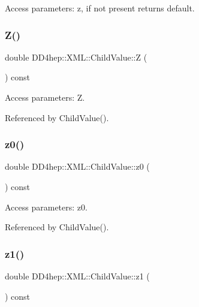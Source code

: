 Access parameters\+: z, if not present returns default. 

\hypertarget{struct_d_d4hep_1_1_x_m_l_1_1_child_value_adec6095e2e95fe6051a444861177f74b}{}\label{struct_d_d4hep_1_1_x_m_l_1_1_child_value_adec6095e2e95fe6051a444861177f74b} 
\subsubsection{\texorpdfstring{Z()}{Z()}}
{\footnotesize\ttfamily double D\+D4hep\+::\+X\+M\+L\+::\+Child\+Value\+::Z (\begin{DoxyParamCaption}{ }\end{DoxyParamCaption}) const}



Access parameters\+: Z. 



Referenced by Child\+Value().

\hypertarget{struct_d_d4hep_1_1_x_m_l_1_1_child_value_a3ee0d2bf19020a3570a9957379824ca0}{}\label{struct_d_d4hep_1_1_x_m_l_1_1_child_value_a3ee0d2bf19020a3570a9957379824ca0} 
\subsubsection{\texorpdfstring{z0()}{z0()}}
{\footnotesize\ttfamily double D\+D4hep\+::\+X\+M\+L\+::\+Child\+Value\+::z0 (\begin{DoxyParamCaption}{ }\end{DoxyParamCaption}) const}



Access parameters\+: z0. 



Referenced by Child\+Value().

\hypertarget{struct_d_d4hep_1_1_x_m_l_1_1_child_value_ad2bac93b7474e4ad40a3e782d44c02d1}{}\label{struct_d_d4hep_1_1_x_m_l_1_1_child_value_ad2bac93b7474e4ad40a3e782d44c02d1} 
\subsubsection{\texorpdfstring{z1()}{z1()}}
{\footnotesize\ttfamily double D\+D4hep\+::\+X\+M\+L\+::\+Child\+Value\+::z1 (\begin{DoxyParamCaption}{ }\end{DoxyParamCaption}) const}



